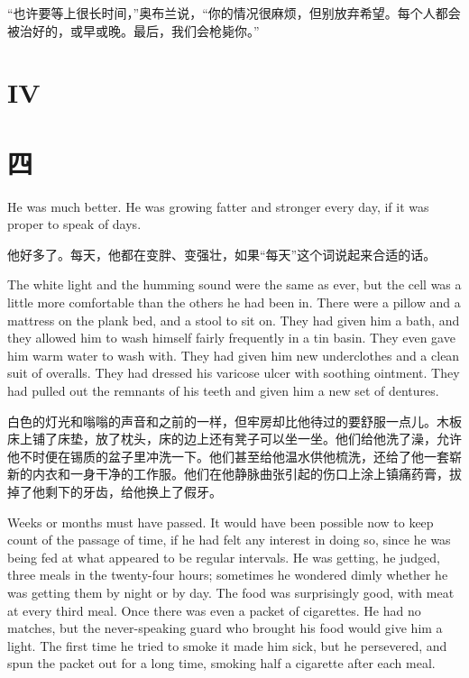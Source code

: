 \begin{paracol}{2}
\switchcolumn

``也许要等上很长时间，''奥布兰说，``你的情况很麻烦，但别放弃希望。每个人都会被治好的，或早或晚。最后，我们会枪毙你。''

\switchcolumn*


\section{IV}\label{iv-2}

\switchcolumn

\section*{四}\label{ux4e8cux5341ux4e8c}

\switchcolumn*

He was much better. He was growing fatter and stronger every day, if it
was proper to speak of days.

\switchcolumn

他好多了。每天，他都在变胖、变强壮，如果``每天''这个词说起来合适的话。

\switchcolumn*

The white light and the humming sound were the same as ever, but the
cell was a little more comfortable than the others he had been in. There
were a pillow and a mattress on the plank bed, and a stool to sit on.
They had given him a bath, and they allowed him to wash himself fairly
frequently in a tin basin. They even gave him warm water to wash with.
They had given him new underclothes and a clean suit of overalls. They
had dressed his varicose ulcer with soothing ointment. They had pulled
out the remnants of his teeth and given him a new set of dentures.

\switchcolumn

白色的灯光和嗡嗡的声音和之前的一样，但牢房却比他待过的要舒服一点儿。木板床上铺了床垫，放了枕头，床的边上还有凳子可以坐一坐。他们给他洗了澡，允许他不时便在锡质的盆子里冲洗一下。他们甚至给他温水供他梳洗，还给了他一套崭新的内衣和一身干净的工作服。他们在他静脉曲张引起的伤口上涂上镇痛药膏，拔掉了他剩下的牙齿，给他换上了假牙。

\switchcolumn*

Weeks or months must have passed. It would have been possible now to
keep count of the passage of time, if he had felt any interest in doing
so, since he was being fed at what appeared to be regular intervals. He
was getting, he judged, three meals in the twenty-four hours; sometimes
he wondered dimly whether he was getting them by night or by day. The
food was surprisingly good, with meat at every third meal. Once there
was even a packet of cigarettes. He had no matches, but the
never-speaking guard who brought his food would give him a light. The
first time he tried to smoke it made him sick, but he persevered, and
spun the packet out for a long time, smoking half a cigarette after each
meal.


\end{paracol}
